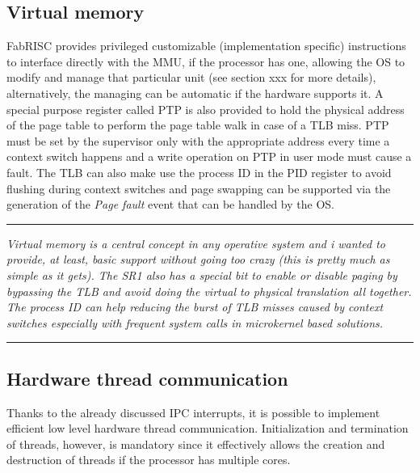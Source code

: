 \documentclass{article}
\begin{document}
        \subsection{Virtual memory}

            FabRISC provides privileged customizable (implementation specific) instructions to interface directly with the MMU, if the processor has one, allowing the OS to modify and manage that particular unit (see section xxx for more details), alternatively, the managing can be automatic if the hardware supports it. A special purpose register called PTP is also provided to hold the physical address of the page table to perform the page table walk in case of a TLB miss. PTP must be set by the supervisor only with the appropriate address every time a context switch happens and a write operation on PTP in user mode must cause a fault. The TLB can also make use the process ID in the PID register to avoid flushing during context switches and page swapping can be supported via the generation of the \textit{Page fault} event that can be handled by the OS.

        \par\noindent\rule{\textwidth}{0.4pt}
        \textit{Virtual memory is a central concept in any operative system and i wanted to provide, at least, basic support without going too crazy (this is pretty much as simple as it gets). The SR1 also has a special bit to enable or disable paging by bypassing the TLB and avoid doing the virtual to physical translation all together. The process ID can help reducing the burst of TLB misses caused by context switches especially with frequent system calls in microkernel based solutions.}
        \par\noindent\rule{\textwidth}{0.4pt}

        \subsection{Hardware thread communication}

            Thanks to the already discussed IPC interrupts, it is possible to implement efficient low level hardware thread communication. Initialization and termination of threads, however, is mandatory since it effectively allows the creation and destruction of threads if the processor has multiple cores.
\end{document}
